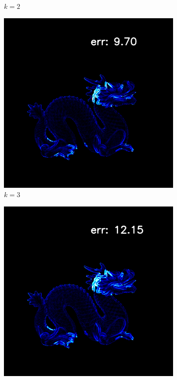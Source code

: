 \begin{figure}[th]
\begin{subfigure}[b]{0.24\linewidth}
		\caption{$ k=2 $}
	\end{subfigure}
	\begin{subfigure}[b]{0.24\linewidth}
	\includegraphics[width=\linewidth]{./Figures/svd-synthetic/k-compare/k3.png}
	\caption{$ k=3 $}
\end{subfigure}
	\begin{subfigure}[b]{0.24\linewidth}
	\includegraphics[width=\linewidth]{./Figures/svd-synthetic/k-compare/k4.png}

\end{subfigure}
\end{figure}

